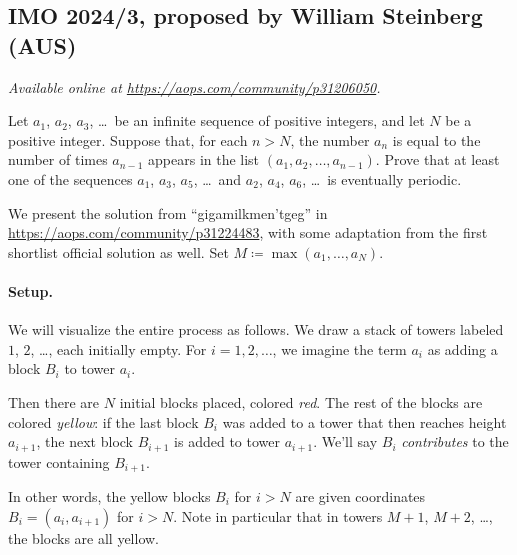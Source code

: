\documentclass[11pt]{scrartcl}
\begin{document}
\subsection{IMO 2024/3, proposed by William Steinberg (AUS)}
\textsl{Available online at \url{https://aops.com/community/p31206050}.}
\begin{mdframed}[style=mdpurplebox,frametitle={Problem statement}]
Let $a_1$, $a_2$, $a_3$, \dots\ be an infinite sequence of positive integers,
and let $N$ be a positive integer.
Suppose that, for each $n > N$,
the number $a_n$ is equal to the number of times $a_{n-1}$ appears
in the list $(a_1, a_2, \dots, a_{n-1})$.
Prove that at least one of the sequences $a_1$, $a_3$, $a_5$, \dots\
and $a_2$, $a_4$, $a_6$, \dots\ is eventually periodic.
\end{mdframed}
We present the solution from ``gigamilkmen'tgeg''
in \url{https://aops.com/community/p31224483},
with some adaptation from the first shortlist official solution as well.
Set $M \coloneqq \max(a_1, \dots, a_N)$.

\paragraph{Setup.}
We will visualize the entire process as follows.
We draw a stack of towers labeled $1$, $2$, \dots, each initially empty.
For $i=1,2,\dots$, we imagine the term $a_i$ as adding a block $B_i$ to tower $a_i$.

Then there are $N$ initial blocks placed, colored \emph{red}.
The rest of the blocks are colored \emph{yellow}:
if the last block $B_i$ was added to a tower that then reaches height $a_{i+1}$,
the next block $B_{i+1}$ is added to tower $a_{i+1}$.
We'll say $B_i$ \emph{contributes} to the tower containing $B_{i+1}$.

In other words, the yellow blocks $B_i$ for $i > N$
are given coordinates $B_i = (a_i, a_{i+1})$ for $i>N$.
Note in particular that in towers $M+1$, $M+2$, \dots, the blocks are all yellow.
\end{document}
